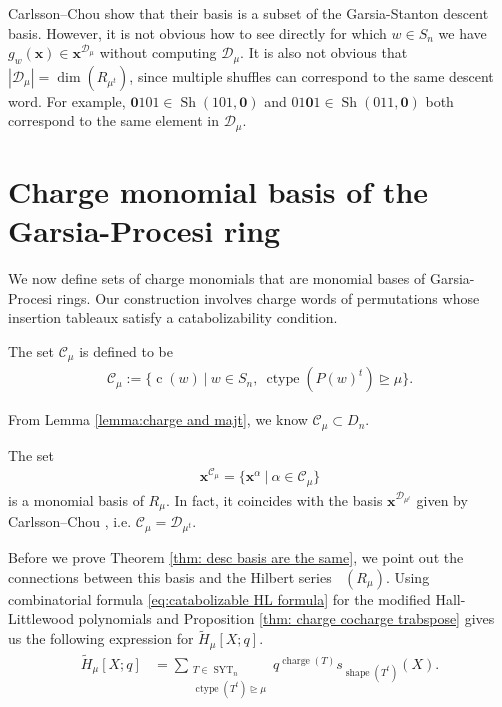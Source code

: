 \documentclass[ALCO, Unicode]{cedram}
\DeclareMathOperator{\charge}{charge}
\DeclareMathOperator{\syt}{SYT}
\DeclareMathOperator{\ctype}{ctype}
\DeclareMathOperator{\Hilb}{Hilb}
\DeclareMathOperator{\sh}{Sh}
\DeclareMathOperator{\shape}{shape}
\DeclareMathOperator{\cw}{c}
\DeclareMathOperator{\Hilbq}{\Hilb_q}
\newcommand{\mHL}{\tilde{H}}
\begin{document}
\begin{rema}
    Carlsson--Chou show that their basis is a subset of the Garsia-Stanton descent basis. 
However, it is not obvious how to see directly for which $w\in S_n$ we have $g_w(\mathbf{x}) \in \mathbf{x}^{\mathcal{D}_{\mu}}$ without computing $\mathcal{D}_\mu$.
It is also not obvious that $|\mathcal{D}_{\mu}| = \dim(R_{\mu^t})$, since multiple shuffles can correspond to the same descent word. For example, $\mathbf{0}101 \in \sh(101,\mathbf{0})$ and $01\mathbf{0}1 \in \sh(011,\mathbf{0})$ both correspond to the same element in $\mathcal{D}_{\mu}$.

\end{rema}

\section{Charge monomial basis of the Garsia-Procesi ring}\label{section:descent basis}
We now define sets of charge monomials that are monomial bases of Garsia-Procesi rings.
Our construction involves charge words of permutations whose insertion tableaux satisfy a catabolizability condition.

\begin{defi}
    The set $\mathcal{C}_\mu$ is defined to be
\begin{align}\label{def:C_mu}
    \mathcal{C}_\mu := \{\cw(w)\ | \ w\in S_n, \  \ctype(P(w) ^t)\unrhd\mu\}.
\end{align}
\end{defi}

From Lemma \ref{lemma:charge and majt}, we know $\mathcal{C}_\mu\subset D_n$.

\begin{thm1}
\makeatletter{}\makeatother
\label{thm: desc basis are the same} 
    The set 
    \begin{align}\label{eq: our basis}
        \mathbf{x}^{\mathcal{C}_\mu} = \{\mathbf{x}^\alpha \ | \ \alpha \in \mathcal{C}_\mu\}
    \end{align}
     is a monomial basis of $R_{\mu}$. 
       In fact, it coincides with the basis $  \mathbf{x}^{\mathcal{D}_{\mu^t}}$ given by Carlsson--Chou \cite{CC}, i.e. $\mathcal{C}_\mu = \mathcal{D}_{\mu^t}$.
\end{thm1}

Before we prove Theorem \ref{thm: desc basis are the same}, we point out the connections between this basis and the Hilbert series $\Hilbq(R_{\mu})$.
Using combinatorial formula \eqref{eq:catabolizable HL formula} for the modified Hall-Littlewood polynomials and Proposition \ref{thm: charge cocharge trabspose} gives us the following expression for $\mHL_{\mu}[X;q]$.
\begin{align}
    \mHL_{\mu} [X;q] &=  \sum\limits_{\substack{T\in \syt_n\\  \ctype(T^t)\unrhd\mu}}  q^{\charge(T)} s_{\shape(T^t)}(X).
\end{align}
\end{document}
